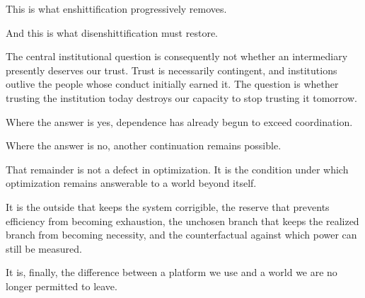 \documentclass[11pt]{article}
\begin{document}
This is what enshittification progressively removes.

And this is what disenshittification must restore.

The central institutional question is consequently not whether an intermediary presently deserves our trust. Trust is necessarily contingent, and institutions outlive the people whose conduct initially earned it. The question is whether trusting the institution today destroys our capacity to stop trusting it tomorrow.

Where the answer is yes, dependence has already begun to exceed coordination.

Where the answer is no, another continuation remains possible.

That remainder is not a defect in optimization. It is the condition under which optimization remains answerable to a world beyond itself.

It is the outside that keeps the system corrigible, the reserve that prevents efficiency from becoming exhaustion, the unchosen branch that keeps the realized branch from becoming necessity, and the counterfactual against which power can still be measured.

It is, finally, the difference between a platform we use and a world we are no longer permitted to leave.

\clearpage
\printbibliography[title={Bibliography}]
\end{document}
